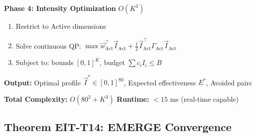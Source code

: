 \begin{tcolorbox}[colback=green!5!white, colframe=green!75!black,
    title=\textbf{Algorithm EIT-EMP-2-A1: EMERGE (Emergent Intervention Selection)}]
\textbf{Phase 4: Intensity Optimization} \hfill $O(K^3)$
\begin{enumerate}[nosep]
    \item Restrict to Active dimensions
    \item Solve continuous QP: $\max \vec{w}^\top_{\text{Act}}\vec{I}_{\text{Act}} + \frac{1}{2}\vec{I}_{\text{Act}}^\top\Gamma_{\text{Act}}\vec{I}_{\text{Act}}$
    \item Subject to: bounds $[0,1]^K$, budget $\sum c_i I_i \leq B$
\end{enumerate}

\textbf{Output:} Optimal profile $\vec{I}^* \in [0,1]^{80}$, Expected effectiveness $E^*$, Avoided pairs

\textbf{Total Complexity:} $O(80^2 + K^3)$ \hfill \textbf{Runtime:} $< 15$ ms (real-time capable)

\end{tcolorbox}

\subsection{Theorem EIT-T14: EMERGE Convergence}
\label{subsec:emerge-convergence}

